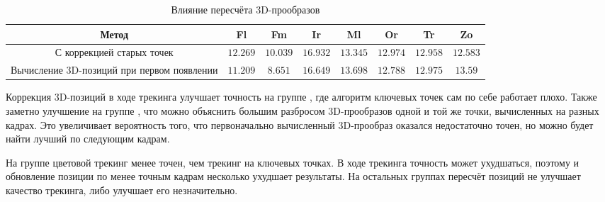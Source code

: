 \begin{table}[h]
\caption{\label{tab:reprojection}Влияние пересчёта 3D-прообразов}
\begin{center}
\begin{tabular}{|c|c|c|c|c|c|c|c|}
\hline
Метод & Fl & Fm & Ir & Ml & Or & Tr & Zo \\
\hline
С коррекцией старых точек & $12.269$ & $10.039$ & $16.932$ & $13.345$ &
$12.974$ &
$12.958$ & $12.583$ \\
\hline
Вычисление 3D-позиций при первом появлении & $11.209$ & $8.651$ & $16.649$ &
$13.698$ & $12.788$ & $12.975$ &
$13.59$ \\
\hline
\end{tabular}
\end{center}
\end{table}

Коррекция 3D-позиций в ходе трекинга улучшает точность на группе , где алгоритм ключевых точек сам по себе работает плохо.
Также заметно улучшение на группе , что можно объяснить
большим разбросом 3D-прообразов одной и той же точки, вычисленных на разных
кадрах.
Это увеличивает вероятность того, что первоначально вычисленный 3D-прообраз
оказался недостаточно точен, но можно будет найти лучший по следующим кадрам.

На группе  цветовой трекинг менее точен, чем трекинг на ключевых
точках.
В ходе трекинга точность может ухудшаться, поэтому и обновление позиции по
менее точным кадрам несколько ухудшает результаты.
На остальных группах пересчёт позиций не улучшает качество трекинга, либо
улучшает его незначительно.
